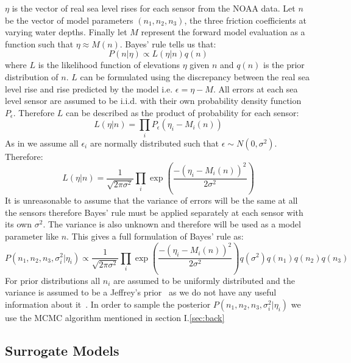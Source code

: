 \documentclass[12pt,a4paper]{article}
\begin{document}
$\eta$ is the vector of real sea level rises for each sensor from the NOAA data. Let $n$ be the vector of model parameters $(n_1,n_2,n_3)$, the three friction coefficients at varying water depths. Finally let $M$ represent the forward model evaluation as a function such that $\eta \approx M(n)$. Bayes' rule tells us that:
\begin{equation}
	P(n|\eta) \propto L(\eta|n)q(n)
\end{equation}
where $L$ is the likelihood function of elevations $\eta$ given $n$ and $q(n)$ is the prior distribution of $n$. $L$ can be formulated using the discrepancy between the real sea level rise and rise predicted by the model i.e. $\epsilon=\eta-M$. All errors at each sea level sensor are assumed to be i.i.d. with their own probability density function $P_\epsilon$. Therefore $L$ can be described as the product of probability for each sensor:
\begin{equation}
	L(\eta|n)=\prod_i P_\epsilon(\eta_i - M_i(n))
\end{equation}
As in  we assume all $\epsilon_i$ are normally distributed such that $\epsilon\sim N(0,\sigma^2)$. Therefore:
\begin{equation}
	L(\eta|n) = \frac{1}{\sqrt{2\pi\sigma^2}}\prod_i \exp \left(   \frac{-(\eta_i-M_i(n))^2}{2\sigma^2}  \right)
\end{equation}
It is unreasonable to assume that the variance of errors will be the same at all the sensors therefore Bayes' rule must be applied separately at each sensor with its own $\sigma^2$. The variance is also unknown and therefore will be used as a model parameter like $n$. This gives a full formulation of Bayes' rule as:
\begin{equation}
	P(n_1,n_2,n_3,\sigma^2_i|\eta_i)\propto \frac{1}{\sqrt{2\pi\sigma^2}}\prod_i\exp\left(
	\frac{-(\eta_i - M_i(n))^2}{2\sigma^2}
	\right)q(\sigma^2)q(n_1)q(n_2)q(n_3)
\end{equation}
For prior distributions all $n_i$ are assumed to be uniformly distributed and the variance is assumed to be a Jeffrey's prior~\cite{bayesbook} as we do not have any useful information about it~\cite{tsunami}. In order to sample the posterior $P(n_1,n_2,n_3,\sigma^2_i|\eta_i)$ we use the MCMC algorithm mentioned in section I.\ref{sec:back}
\subsection{Surrogate Models}
\end{document}
